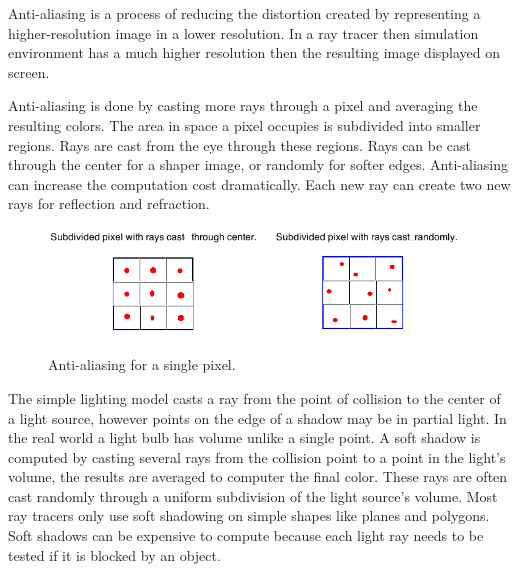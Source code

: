 Anti-aliasing is a process of reducing the distortion created by representing a higher-resolution image in a lower resolution.  In a ray tracer then simulation environment has a much higher resolution then the resulting image displayed on screen. 

Anti-aliasing is done by casting more rays through a pixel and averaging the resulting colors.  The area in space a pixel occupies is subdivided into smaller regions.  Rays are cast from the eye through these regions.  Rays can be cast through the center for a shaper image, or randomly for softer edges.  Anti-aliasing can increase the computation cost dramatically.  Each new ray can create two new rays for reflection and refraction.

\begin{figure}[H]
\includegraphics[scale=0.6]{aa.png} 
\caption{Anti-aliasing for a single pixel.}
\label{aa}
\end{figure}

 The simple lighting model casts a ray from the point of collision to the center of a light source, however points on the edge of a shadow may be in partial light.  In the real world a light bulb has volume unlike a single point.  A soft shadow is computed by casting several rays from the collision point to a point in the light's volume, the results are averaged to computer the final color.  These rays are often cast randomly through a uniform subdivision of the light source's volume.  Most ray tracers only use soft shadowing on simple shapes like planes and polygons.  Soft shadows can be expensive to compute because each light ray needs to be tested if it is blocked by an object.

